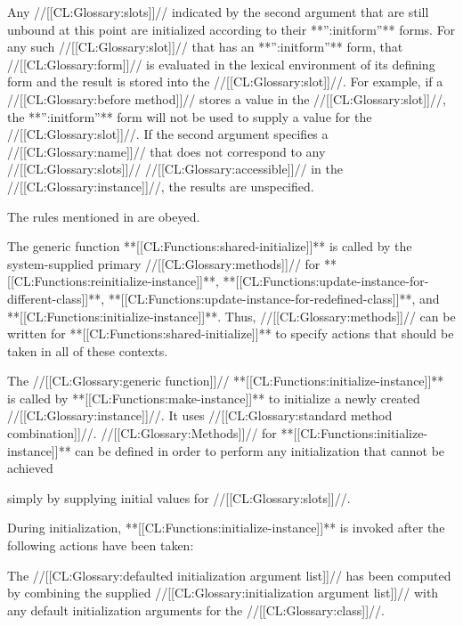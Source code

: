 \itemitem{\bull} Any //[[CL:Glossary:slots]]//  indicated by the second argument that are still unbound at this point are initialized according to their  **'':initform''** forms.  For any such //[[CL:Glossary:slot]]//  that has an **'':initform''** form, that //[[CL:Glossary:form]]// is evaluated in the  lexical environment of its defining   form and the result is stored into the //[[CL:Glossary:slot]]//.   For example, if a //[[CL:Glossary:before method]]// stores a value in the  //[[CL:Glossary:slot]]//, the **'':initform''** form will not be used to supply a value  for the //[[CL:Glossary:slot]]//.  If the second argument specifies a //[[CL:Glossary:name]]// that does not correspond to any //[[CL:Glossary:slots]]// //[[CL:Glossary:accessible]]//  in the //[[CL:Glossary:instance]]//, the results are unspecified.

\itemitem{\bull} The rules mentioned in {\secref\InitargRules} are obeyed.

\endlist
                       The generic function **[[CL:Functions:shared-initialize]]** is called by the system-supplied primary //[[CL:Glossary:methods]]//  for **[[CL:Functions:reinitialize-instance]]**, **[[CL:Functions:update-instance-for-different-class]]**,  **[[CL:Functions:update-instance-for-redefined-class]]**, and  **[[CL:Functions:initialize-instance]]**.  Thus, //[[CL:Glossary:methods]]// can be written for  **[[CL:Functions:shared-initialize]]** to specify actions that should be taken in all of these contexts.

\endsubsection%

                       The //[[CL:Glossary:generic function]]// **[[CL:Functions:initialize-instance]]** is called by  **[[CL:Functions:make-instance]]** to initialize a newly created //[[CL:Glossary:instance]]//. It uses //[[CL:Glossary:standard method combination]]//.  //[[CL:Glossary:Methods]]// for  **[[CL:Functions:initialize-instance]]** can be defined in order to perform any initialization that cannot be achieved 

simply by supplying initial values for //[[CL:Glossary:slots]]//.

                         During initialization, **[[CL:Functions:initialize-instance]]** is invoked after the following actions have been taken:

\beginlist 

\itemitem{\bull} The //[[CL:Glossary:defaulted initialization argument list]]//  has been computed by combining the supplied //[[CL:Glossary:initialization argument list]]//  with any default initialization arguments for the //[[CL:Glossary:class]]//.

